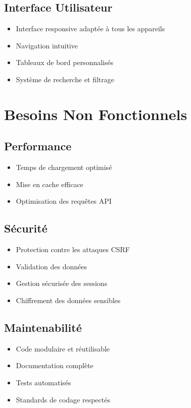 \documentclass[12pt,a4paper]{report}
\begin{document}
\subsection{Interface Utilisateur}
\begin{itemize}
    \item Interface responsive adaptée à tous les appareils
    \item Navigation intuitive
    \item Tableaux de bord personnalisés
    \item Système de recherche et filtrage
\end{itemize}

\section{Besoins Non Fonctionnels}
\subsection{Performance}
\begin{itemize}
    \item Temps de chargement optimisé
    \item Mise en cache efficace
    \item Optimisation des requêtes API
\end{itemize}

\subsection{Sécurité}
\begin{itemize}
    \item Protection contre les attaques CSRF
    \item Validation des données
    \item Gestion sécurisée des sessions
    \item Chiffrement des données sensibles
\end{itemize}

\subsection{Maintenabilité}
\begin{itemize}
    \item Code modulaire et réutilisable
    \item Documentation complète
    \item Tests automatisés
    \item Standards de codage respectés
\end{itemize}
\end{document}
